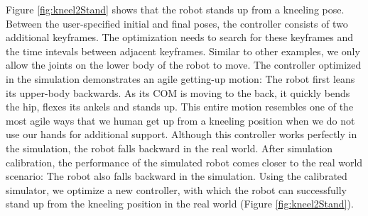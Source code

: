 Figure \ref{fig:kneel2Stand} shows that the robot stands up from a kneeling pose. Between the user-specified initial and final poses, the controller consists of two additional keyframes. The optimization needs to search for these keyframes and the time intevals between adjacent keyframes. Similar to other examples, we only allow the joints on the lower body of the robot to move. The controller optimized in the simulation demonstrates an agile getting-up motion: The robot first leans its upper-body backwards. As its COM is moving to the back, it quickly bends the hip, flexes its ankels and stands up. This entire motion resembles one of the most agile ways that we human get up from a kneeling position when we do not use our hands for additional support. Although this controller works perfectly in the simulation, the robot falls backward in the real world. After simulation calibration, the performance of the simulated robot comes closer to the real world scenario: The robot also falls backward in the simulation. Using the calibrated simulator, we optimize a new controller, with which the robot can successfully stand up from the kneeling position in the real world (Figure \ref{fig:kneel2Stand}).

